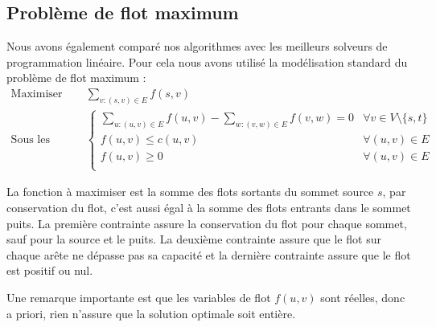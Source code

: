 \documentclass[a4paper]{article}
\begin{document}
\subsection{Problème de flot maximum}
Nous avons également comparé nos algorithmes avec les meilleurs solveurs de programmation linéaire. Pour cela nous avons utilisé la modélisation standard du problème de flot maximum :
\[
		\begin{aligned}
			\text{Maximiser} \quad &\sum_{v:(s, v)\in E} f(s, v) \\
			\text{Sous les contraintes} \quad
			&
			 \begin{cases}
				\displaystyle\sum_{u:(u, v)\in E}{f(u, v)} - \sum_{w:(v, w)\in E}{f(v, w)} = 0 & \forall v \in V \setminus \{s, t\} \\
				f(u, v) \leq c(u, v) & \forall (u, v) \in E \\
				f(u, v) \geq 0 & \forall (u, v) \in E \\
			\end{cases}
		\end{aligned}
\]

La fonction à maximiser est la somme des flots sortants du sommet source $s$, par conservation du flot, c'est aussi égal à la somme des flots entrants dans le sommet puits. La première contrainte assure la conservation du flot pour chaque sommet, sauf pour la source et le puits. La deuxième contrainte assure que le flot sur chaque arête ne dépasse pas sa capacité et la dernière contrainte assure que le flot est positif ou nul.

\begin{remark}
	Une remarque importante est que les variables de flot $f(u, v)$ sont réelles, donc a priori, rien n'assure que la solution optimale soit entière.
\end{remark}
\end{document}
